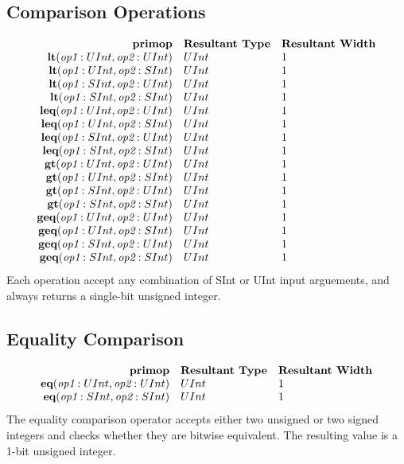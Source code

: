 \documentclass[10pt]{article}
\begin{document}
\subsection{Comparison Operations}
\[
\begin{array}{rll}
\text{\bf primop} & \text{\bf Resultant Type} & \text{\bf Resultant Width} \\
\text{\bf lt}      (\text{\em op1}:UInt, \text{\em op2}:UInt) & UInt & 1    \\
\text{\bf lt}      (\text{\em op1}:UInt, \text{\em op2}:SInt) & UInt & 1    \\
\text{\bf lt}      (\text{\em op1}:SInt, \text{\em op2}:UInt) & UInt & 1    \\
\text{\bf lt}      (\text{\em op1}:SInt, \text{\em op2}:SInt) & UInt & 1    \\
\text{\bf leq}     (\text{\em op1}:UInt, \text{\em op2}:UInt) & UInt & 1    \\
\text{\bf leq}     (\text{\em op1}:UInt, \text{\em op2}:SInt) & UInt & 1    \\
\text{\bf leq}     (\text{\em op1}:SInt, \text{\em op2}:UInt) & UInt & 1    \\
\text{\bf leq}     (\text{\em op1}:SInt, \text{\em op2}:SInt) & UInt & 1    \\
\text{\bf gt}      (\text{\em op1}:UInt, \text{\em op2}:UInt) & UInt & 1    \\
\text{\bf gt}      (\text{\em op1}:UInt, \text{\em op2}:SInt) & UInt & 1    \\
\text{\bf gt}      (\text{\em op1}:SInt, \text{\em op2}:UInt) & UInt & 1    \\
\text{\bf gt}      (\text{\em op1}:SInt, \text{\em op2}:SInt) & UInt & 1    \\
\text{\bf geq}     (\text{\em op1}:UInt, \text{\em op2}:UInt) & UInt & 1    \\
\text{\bf geq}     (\text{\em op1}:UInt, \text{\em op2}:SInt) & UInt & 1    \\
\text{\bf geq}     (\text{\em op1}:SInt, \text{\em op2}:UInt) & UInt & 1    \\
\text{\bf geq}     (\text{\em op1}:SInt, \text{\em op2}:SInt) & UInt & 1    \\
\end{array}
\]
Each operation accept any combination of SInt or UInt input arguements, and always returns a single-bit unsigned integer.

\subsection{Equality Comparison}
\[
\begin{array}{rll}
\text{\bf primop} & \text{\bf Resultant Type} & \text{\bf Resultant Width} \\
\text{\bf eq}(\text{\em op1}:UInt, \text{\em op2}:UInt)     & UInt & 1 \\
\text{\bf eq}(\text{\em op1}:SInt, \text{\em op2}:SInt)     & UInt & 1 \\
\end{array}
\]
The equality comparison operator accepts either two unsigned or two signed integers and checks whether they are bitwise equivalent.
The resulting value is a 1-bit unsigned integer. 
\end{document}
